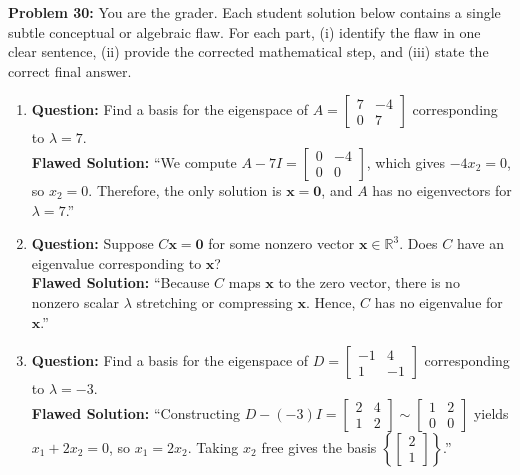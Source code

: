 \documentclass[11pt, letterpaper]{article}
\theoremstyle{definition}
\theoremstyle{remark}
\begin{document}
\vspace{0.4em}
\textbf{Problem 30:}
You are the grader. Each student solution below contains a single subtle conceptual or algebraic flaw. For each part, (i) identify the flaw in one clear sentence, (ii) provide the corrected mathematical step, and (iii) state the correct final answer.
\begin{enumerate}[label=(\alph*)]
    \item \textbf{Question:} Find a basis for the eigenspace of $A = \begin{bmatrix} 7 & -4 \\ 0 & 7 \end{bmatrix}$ corresponding to $\lambda = 7$.\\
    \textbf{Flawed Solution:} ``We compute $A - 7I = \begin{bmatrix} 0 & -4 \\ 0 & 0 \end{bmatrix}$, which gives $-4x_2 = 0$, so $x_2 = 0$. Therefore, the only solution is $\mathbf{x} = \mathbf{0}$, and $A$ has no eigenvectors for $\lambda = 7$.''
    \item \textbf{Question:} Suppose $C\mathbf{x} = \mathbf{0}$ for some nonzero vector $\mathbf{x} \in \mathbb{R}^3$. Does $C$ have an eigenvalue corresponding to $\mathbf{x}$?\\
    \textbf{Flawed Solution:} ``Because $C$ maps $\mathbf{x}$ to the zero vector, there is no nonzero scalar $\lambda$ stretching or compressing $\mathbf{x}$. Hence, $C$ has no eigenvalue for $\mathbf{x}$.''
    \item \textbf{Question:} Find a basis for the eigenspace of $D = \begin{bmatrix} -1 & 4 \\ 1 & -1 \end{bmatrix}$ corresponding to $\lambda = -3$.\\
    \textbf{Flawed Solution:} ``Constructing $D - (-3)I = \begin{bmatrix} 2 & 4 \\ 1 & 2 \end{bmatrix} \sim \begin{bmatrix} 1 & 2 \\ 0 & 0 \end{bmatrix}$ yields $x_1 + 2x_2 = 0$, so $x_1 = 2x_2$. Taking $x_2$ free gives the basis $\left\{ \begin{bmatrix} 2 \\ 1 \end{bmatrix} \right\}$.''
\end{enumerate}
\end{document}
